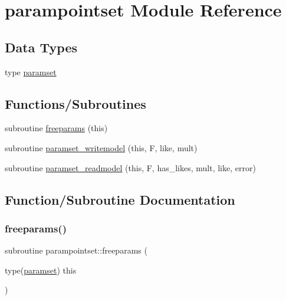 \hypertarget{namespaceparampointset}{}\section{parampointset Module Reference}
\label{namespaceparampointset}
\subsection*{Data Types}
\begin{DoxyCompactItemize}
\item 
type \mbox{\hyperlink{structparampointset_1_1paramset}{paramset}}
\end{DoxyCompactItemize}
\subsection*{Functions/\+Subroutines}
\begin{DoxyCompactItemize}
\item 
subroutine \mbox{\hyperlink{namespaceparampointset_a4403c38deb2c08ca00d3629b211eaeae}{freeparams}} (this)
\item 
subroutine \mbox{\hyperlink{namespaceparampointset_ab3c28fc8a1787822aeec7c139ae0ff5a}{paramset\+\_\+writemodel}} (this, F, like, mult)
\item 
subroutine \mbox{\hyperlink{namespaceparampointset_a41f49e842311c3c0441a2e7a36914a40}{paramset\+\_\+readmodel}} (this, F, has\+\_\+likes, mult, like, error)
\end{DoxyCompactItemize}


\subsection{Function/\+Subroutine Documentation}
\mbox{\label{namespaceparampointset_a4403c38deb2c08ca00d3629b211eaeae}} 
\subsubsection{\texorpdfstring{freeparams()}{freeparams()}}
{\footnotesize\ttfamily subroutine parampointset\+::freeparams (\begin{DoxyParamCaption}\item[{type(\mbox{\hyperlink{structparampointset_1_1paramset}{paramset}})}]{this }\end{DoxyParamCaption})}



